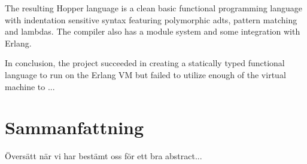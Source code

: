 The resulting Hopper language is a clean basic functional programming language with indentation sensitive syntax featuring polymorphic \glspl{adt}, pattern matching and lambdas. The compiler also has a module system and some integration with Erlang. 

In conclusion, the project succeeded in creating a statically typed functional language to run on the Erlang VM but failed to utilize enough of the virtual machine to ...








\section*{Sammanfattning}
Översätt när vi har bestämt oss för ett bra abstract...



\newpage				%
\thispagestyle{empty}
\mbox{}